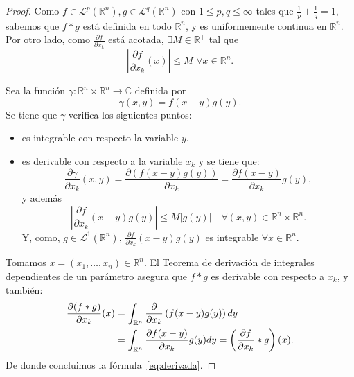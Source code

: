 \begin{proof}
Como  $f \in \mathscr{L}^p(\mathbb{R}^n), g \in \mathscr{L}^q(\mathbb{R}^n)$  con  $1\leq p, q \leq \infty$ tales que $\frac{1}{p}+\frac{1}{q}=1$, sabemos que $f*g$ está definida en todo $\mathbb{R}^n$, y es uniformemente continua en $\mathbb{R}^n$. Por otro lado, como $\frac{\partial f}{\partial x_k}$ está acotada, $\exists M \in \mathbb{R}^+$ tal que \begin{equation}
    \left|\frac{\partial f}{\partial x_k}(x)\right| \leq M \, \, \forall x \in \mathbb{R}^n.
\end{equation}

\noindent Sea la función $\gamma : \mathbb{R}^n  \times \mathbb{R}^n \rightarrow \mathbb{C}$ definida por 
\begin{equation}
    \gamma(x,y) = 
     f(x-y)g(y).
\end{equation}
Se tiene que $\gamma$ verifica los siguientes puntos:
\begin{itemize}
    \item  es integrable con respecto la variable $y$. 
    
\item  es derivable con respecto a la variable $x_k$ y se
tiene que:
\begin{equation}
    \frac{\partial \gamma}{\partial x_k}(x,y) = \frac{\partial \left(f(x-y)g(y)\right)}{\partial x_k} = \frac{\partial f(x-y)}{\partial x_k}g(y),
\end{equation}
y además
\begin{equation}
    \left|  \frac{\partial{f}}{\partial{x_k}}(x-y)g(y)\right| \leq M |g(y)| \quad \forall (x,y) \in \mathbb{R}^n \times  \mathbb{R}^n.
\end{equation}
Y, como, $g \in \mathscr{L}^1(\mathbb{R}^n)$,  $\frac{\partial{f}}{\partial{x_k}}(x-y)g(y)$ es integrable $\forall x \in \mathbb{R}^n$.
\end{itemize}

\noindent Tomamos $x = (x_1,\ldots,x_n) \in \mathbb{R}^n$. El Teorema de derivación de integrales dependientes de un parámetro asegura que $f*g$ es derivable con respecto a $x_k$, y también:
 \begin{align}
    \frac{\partial (f*g)}{\partial x_k}(x) &= \int_{\mathbb{R}^n}\frac {\partial}{\partial x_k}\left(f(x-y)g(y)\right)dy \\ &= \int_{\mathbb{R}^n}\frac{\partial f(x-y)}{\partial x_k}g(y)dy  = \left(\frac{\partial f}{\partial x_k}*g\right)(x).\qedhere
\end{align}
De donde concluimos la fórmula~\eqref{eq:derivada}.
\end{proof}


